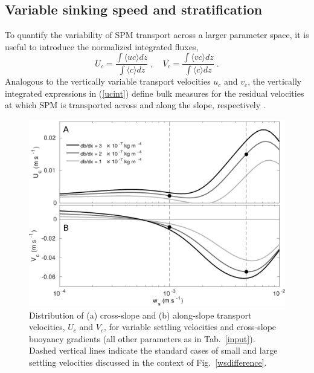 \subsection{Variable sinking speed and stratification}
To quantify the variability of SPM transport across a larger parameter
space, it is useful to introduce the normalized integrated fluxes,
\begin{equation}
  \label{ucint}
  U_c = \frac{ \int \langle uc \rangle dz}{\int \langle c \rangle dz}
  \; , \quad V_c = \frac{\int \langle vc \rangle dz}{\int \langle c
    \rangle dz} \; .
\end{equation}
Analogous to the vertically variable transport velocities $u_c$ and
$v_c$, the vertically integrated expressions in (\ref{ucint}) define
bulk measures for the residual velocities at which SPM is transported
across and along the slope, respectively \citep{schulzumlauf2016}.

\begin{figure}
  \noindent\includegraphics[width=30pc]{wsvariation.pdf}
  \caption{Distribution of (a) cross-slope and (b) along-slope
    transport velocities, $U_c$ and $V_c$, for variable settling
    velocities and cross-slope buoyancy gradients (all other
    parameters as in Tab.\ \ref{input}).  Dashed vertical lines
    indicate the standard cases of small and large settling velocities
    discussed in the context of
    Fig.\ \ref{wsdifference}.}\label{wsvariation}
\end{figure}


